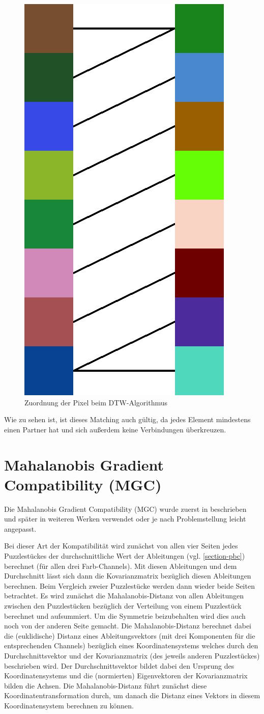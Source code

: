 \documentclass{whswinvcbook}
\begin{document}
\begin{figure}[H]
    \centering
    \includegraphics[width=0.30\linewidth]{img/dtw_ex2.png}
    \caption{Zuordnung der Pixel beim DTW-Algorithmus}
    \label{fig-dtw-ex2}
\end{figure}
Wie zu sehen ist, ist dieses Matching auch gültig, da jedes Element mindestens einen Partner hat und sich außerdem keine Verbindungen überkreuzen.
\section{Mahalanobis Gradient Compatibility (MGC)}\label{section-mgc}
Die Mahalanobis Gradient Compatibility (MGC) wurde zuerst in \cite{gallagher} beschrieben und später in weiteren Werken \cite{linear,paikin,loop,robust,crisjim} verwendet oder je nach Problemstellung leicht angepasst.

Bei dieser Art der Kompatibilität wird zunächst von allen vier Seiten jedes Puzzlestückes der durchschnittliche Wert der Ableitungen (vgl. \ref{section-pbc}) berechnet (für allen drei Farb-Channels). Mit diesen Ableitungen und dem Durchschnitt lässt sich dann die Kovarianzmatrix bezüglich diesen Ableitungen berechnen. Beim Vergleich zweier Puzzlestücke werden dann wieder beide Seiten betrachtet. Es wird zunächst die Mahalanobis-Distanz von allen Ableitungen zwischen den Puzzlestücken bezüglich der Verteilung von einem Puzzlestück berechnet und aufsummiert. Um die Symmetrie beizubehalten wird dies auch noch von der anderen Seite gemacht. Die Mahalanobis-Distanz berechnet dabei die (euklidische) Distanz eines Ableitungsvektors (mit drei Komponenten für die entsprechenden Channels) bezüglich eines Koordinatensystems welches durch den Durchschnittsvektor und der Kovarianzmatrix (des jeweils anderen Puzzlestückes) beschrieben wird. Der Durchschnittsvektor bildet dabei den Ursprung des Koordinatensystems und die (normierten) Eigenvektoren der Kovarianzmatrix bilden die Achsen. Die Mahalanobis-Distanz führt zunächst diese Koordinatentransformation durch, um danach die Distanz eines Vektors in diesem Koordinatensystem berechnen zu können.
\end{document}
